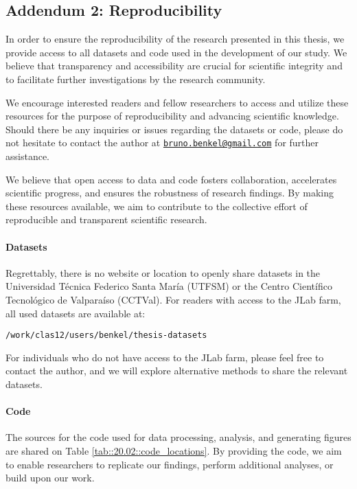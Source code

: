 \subsection*{Addendum 2: Reproducibility}
\label{20.02::reproducibility}
    In order to ensure the reproducibility of the research presented in this thesis, we provide access to all datasets and code used in the development of our study.
    We believe that transparency and accessibility are crucial for scientific integrity and to facilitate further investigations by the research community.

    We encourage interested readers and fellow researchers to access and utilize these resources for the purpose of reproducibility and advancing scientific knowledge.
    Should there be any inquiries or issues regarding the datasets or code, please do not hesitate to contact the author at \href{mailto:bruno.benkel@gmail.com}{\texttt{bruno.benkel@gmail.com}} for further assistance.

    We believe that open access to data and code fosters collaboration, accelerates scientific progress, and ensures the robustness of research findings.
    By making these resources available, we aim to contribute to the collective effort of reproducible and transparent scientific research.

    \paragraph{Datasets}
    Regrettably, there is no website or location to openly share datasets in the Universidad Técnica Federico Santa María (UTFSM) or the Centro Científico Tecnológico de Valparaíso (CCTVal).
    For readers with access to the JLab farm, all used datasets are available at:

    \begin{center}
        \texttt{/work/clas12/users/benkel/thesis-datasets}
    \end{center}

    For individuals who do not have access to the JLab farm, please feel free to contact the author, and we will explore alternative methods to share the relevant datasets.

    \paragraph{Code}
    The sources for the code used for data processing, analysis, and generating figures are shared on Table \ref{tab::20.02::code_locations}.
    By providing the code, we aim to enable researchers to replicate our findings, perform additional analyses, or build upon our work.

